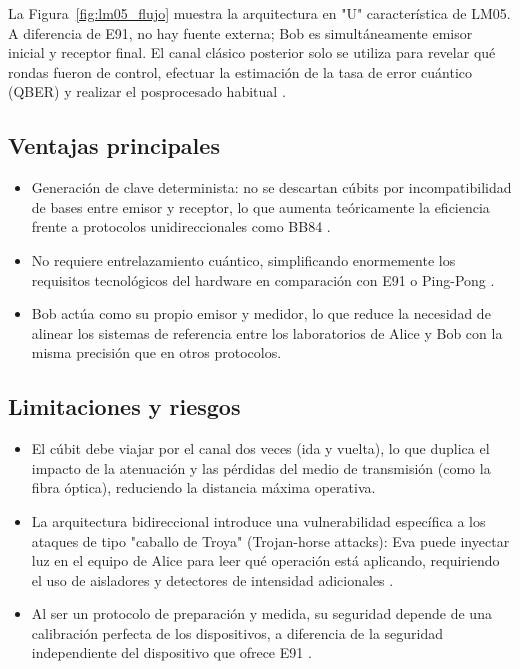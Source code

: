 La Figura~\ref{fig:lm05_flujo} muestra la arquitectura en "U" característica de LM05. A diferencia de E91, no hay fuente externa; Bob es simultáneamente emisor inicial y receptor final. El canal clásico posterior solo se utiliza para revelar qué rondas fueron de control, efectuar la estimación de la tasa de error cuántico (QBER) y realizar el posprocesado habitual \citep{lucamarini2005,scarani2009}.

\subsection{Ventajas principales}
\begin{itemize}
    \item Generación de clave determinista: no se descartan cúbits por incompatibilidad de bases entre emisor y receptor, lo que aumenta teóricamente la eficiencia frente a protocolos unidireccionales como BB84 \citep{lucamarini2005}.
    \item No requiere entrelazamiento cuántico, simplificando enormemente los requisitos tecnológicos del hardware en comparación con E91 o Ping-Pong \citep{ekert1991,bostrom2002}.
    \item Bob actúa como su propio emisor y medidor, lo que reduce la necesidad de alinear los sistemas de referencia entre los laboratorios de Alice y Bob con la misma precisión que en otros protocolos.
\end{itemize}

\subsection{Limitaciones y riesgos}
\begin{itemize}
    \item El cúbit debe viajar por el canal dos veces (ida y vuelta), lo que duplica el impacto de la atenuación y las pérdidas del medio de transmisión (como la fibra óptica), reduciendo la distancia máxima operativa.
    \item La arquitectura bidireccional introduce una vulnerabilidad específica a los ataques de tipo "caballo de Troya" (Trojan-horse attacks): Eva puede inyectar luz en el equipo de Alice para leer qué operación está aplicando, requiriendo el uso de aisladores y detectores de intensidad adicionales \citep{gisin2002}.
    \item Al ser un protocolo de preparación y medida, su seguridad depende de una calibración perfecta de los dispositivos, a diferencia de la seguridad independiente del dispositivo que ofrece E91 \citep{acin2007}.
\end{itemize}

